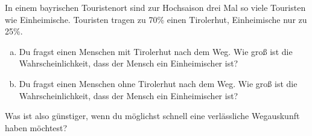 \documentclass[%
11pt,%
twoside,%
titlepage,%
german,%
headsepline%
]{scrartcl}
\begin{document}

\begin{ueb}
In einem bayrischen Touristenort sind zur Hochsaison drei Mal so viele Touristen wie Einheimische. Touristen tragen zu 70\% einen Tirolerhut, Einheimische nur zu 25\%.
\begin{enumerate}[a)]
\item Du fragst einen Menschen mit Tirolerhut nach dem Weg. Wie groß ist die Wahrscheinlichkeit, dass der
Mensch ein Einheimischer ist?
\item Du fragst einen Menschen ohne Tirolerhut nach dem Weg. Wie groß ist die Wahrscheinlichkeit, dass
der Mensch ein Einheimischer ist?
\end{enumerate}
Was ist also günstiger, wenn du möglichst schnell eine verlässliche Wegauskunft haben möchtest?
\end{ueb}


\end{document}
